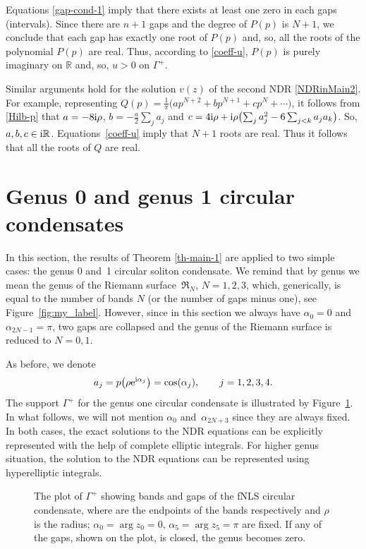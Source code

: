 \documentclass[pdftex]{sigma}
\numberwithin{equation}{section}
\newcommand{\G}{\Gamma}
\def\R{{\mathbb R}}
\def\a{\alpha}
\def\r{\rho}
\def\G{\Gamma}
\def\r{\rho}
\begin{document}
Equations \eqref{gap-cond-1} imply
that there exists at least one zero in each gaps (intervals). Since there are $n+1$ gaps and the degree of $P(p)$ is $N+1$, we conclude that each gap has exactly one root of $P(p)$ and, so, all the roots of the polynomial $P(p)$ are real. Thus, according to \eqref{coeff-u}, $P(p)$ is purely imaginary on $\R$ and, so, $u>0$ on $\G^+$.

Similar arguments hold for the solution $v(z)$ of the second NDR \eqref{NDRinMain2}.
For example, representing $Q(p)=\frac{1}{\pi}\bigl(ap^{N+2}+bp^{N+1}+cp^N+\cdots\bigr)$, it follows from \eqref{Hilb-p} that $a=-8{\rm i}\r $, $b=-\frac a2 \sum_j a_j$ and $c=4{\rm i}\r +{\rm i}\r \bigl(\sum_{j}a_j^2-6\sum_{j<k}a_ja_k\bigr)$. So, $a,b,c\in {\rm i}\R$. Equations~\eqref{coeff-u} imply that $N+1$ roots are real. Thus it follows that all the roots of $Q$ are real.

\section{Genus 0 and genus 1 circular condensates}\label{s3}
In this section, the results of Theorem \ref{th-main-1} are applied to two simple cases: the genus 0 and~1 circular soliton condensate.
We remind that by genus we mean the genus of the Riemann surface~$\mathfrak R_N$, $N=1,2,3$, which, generically, is equal to the number of bands $N$ (or the number of gaps minus one), see Figure~\ref{fig:my_label}.
However, since in this section we always have $\alpha_0=0$ and $\alpha_{2N-1}=\pi$, two gaps are collapsed and the genus of the Riemann surface is reduced to $N=0,1$.

As before, we denote
\[
a_j=p\bigl(\r {\rm e}^{{\rm i}\a_j}\bigr)=\cos(\alpha_j), \qquad j=1,2,3,4.
\]
 The support $\G^+$ for the genus one circular condensate is illustrated by Figure~\ref{fig:genus one master}. In what follows, we will not mention $\a_0$ and~$\a_{2N+3}$ since they are always fixed.
In both cases, the exact solutions to the NDR equations can be explicitly represented with the help of complete elliptic integrals. For higher genus situation, the solution to the NDR equations can be represented using hyperelliptic integrals.

\begin{figure}[t]
\centering
{}
\caption{The plot of $\Gamma^+$ showing bands and gaps of the fNLS circular condensate, where  are the endpoints of the bands
respectively and $\rho$ is the radius; $\alpha_0=\arg z_0=0$, $\alpha_5=\arg z_5=\pi$ are fixed. If any of the gaps, shown on the plot, is closed, the genus becomes zero.}
\label{fig:genus one master}
\end{figure}
\end{document}
